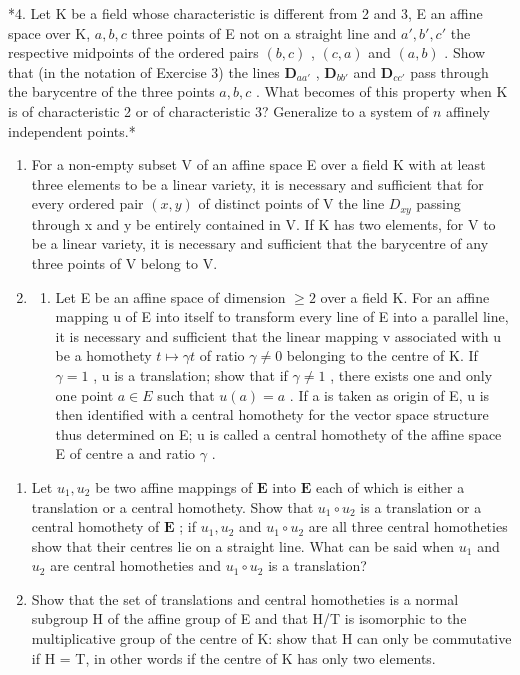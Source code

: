 *4. Let K be a field whose characteristic is different from 2 and 3, E an affine space over K, \(a, b, c\) three points of E not on a straight line and \(a', b', c'\) the respective midpoints of the ordered pairs \((b, c)\) , \((c, a)\) and \((a, b)\) . Show that (in the notation of Exercise 3) the lines \(\mathbf{D}_{aa'}\) , \(\mathbf{D}_{bb'}\) and \(\mathbf{D}_{cc'}\) pass through the barycentre of the three points \(a, b, c\) . What becomes of this property when K is of characteristic 2 or of characteristic 3? Generalize to a system of \(n\) affinely independent points.*

\begin{enumerate}
\def\labelenumi{\arabic{enumi}.}
\setcounter{enumi}{4}
\item
  For a non-empty subset V of an affine space E over a field K with at least three elements to be a linear variety, it is necessary and sufficient that for every ordered pair \((x,y)\) of distinct points of V the line \(D_{xy}\) passing through x and y be entirely contained in V. If K has two elements, for V to be a linear variety, it is necessary and sufficient that the barycentre of any three points of V belong to V.
\item
  \begin{enumerate}
  \def\labelenumii{(\alph{enumii})}
  \tightlist
  \item
    Let E be an affine space of dimension \(\geqslant2\) over a field K. For an affine mapping u of E into itself to transform every line of E into a parallel line, it is necessary and sufficient that the linear mapping v associated with u be a homothety \(t\mapsto\gamma t\) of ratio \(\gamma\neq0\) belonging to the centre of K. If \(\gamma=1\) , u is a translation; show that if \(\gamma\neq1\) , there exists one and only one point \(a\in E\) such that \(u(a)=a\) . If a is taken as origin of E, u is then identified with a central homothety for the vector space structure thus determined on E; u is called a central homothety of the affine space E of centre a and ratio \(\gamma\) .
  \end{enumerate}
\end{enumerate}

\begin{enumerate}
\def\labelenumi{(\alph{enumi})}
\setcounter{enumi}{1}
\item
  Let \(u_1, u_2\) be two affine mappings of \(\mathbf{E}\) into \(\mathbf{E}\) each of which is either a translation or a central homothety. Show that \(u_1 \circ u_2\) is a translation or a central homothety of \(\mathbf{E}\) ; if \(u_1, u_2\) and \(u_1 \circ u_2\) are all three central homotheties show that their centres lie on a straight line. What can be said when \(u_1\) and \(u_2\) are central homotheties and \(u_1 \circ u_2\) is a translation?
\item
  Show that the set of translations and central homotheties is a normal subgroup H of the affine group of E and that H/T is isomorphic to the multiplicative group of the centre of K: show that H can only be commutative if H = T, in other words if the centre of K has only two elements.
\end{enumerate}

